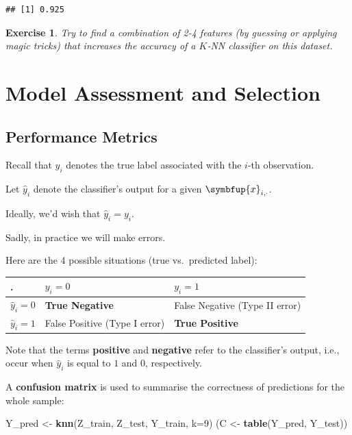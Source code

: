 \documentclass[10pt,b5paper,krantz1]{krantz}
\newenvironment{Shaded}{\begin{snugshade}}{\end{snugshade}}
\newcommand{\DataTypeTok}[1]{\textcolor[rgb]{0.27,0.27,0.27}{#1}}
\newcommand{\DecValTok}[1]{\textcolor[rgb]{0.06,0.06,0.06}{#1}}
\newcommand{\KeywordTok}[1]{\textcolor[rgb]{0.27,0.27,0.27}{\textbf{#1}}}
\newcommand{\NormalTok}[1]{#1}
\newcommand{\StringTok}[1]{\textcolor[rgb]{0.5,0.5,0.5}{#1}}
\newtheorem{exercise}{Exercise}[chapter]
\renewcommand{\mathbf}[1]{\symbfup{#1}}
\begin{document}
\begin{verbatim}
## [1] 0.925
\end{verbatim}

\begin{exercise}

Try to find a combination of 2-4 features (by guessing or applying magic tricks)
that increases the accuracy of a \(K\)-NN classifier on this dataset.

\end{exercise}

\hypertarget{model-assessment-and-selection}{%
\section{Model Assessment and Selection}\label{model-assessment-and-selection}}

\hypertarget{performance-metrics}{%
\subsection{Performance Metrics}\label{performance-metrics}}

Recall that \(y_i\) denotes the true label associated with the \(i\)-th observation.

Let \(\hat{y}_i\) denote the classifier's output for a given \(\mathbf{x}_{i,\cdot}\).

Ideally, we'd wish that \(\hat{y}_i=y_i\).

Sadly, in practice we will make errors.

Here are the 4 possible situations (true vs.~predicted label):

\begin{longtable}[]{@{}lll@{}}
\toprule
. & \(y_i=0\) & \(y_i=1\)\tabularnewline
\midrule
\endhead
\(\hat{y}_i=0\) & \textbf{True Negative} & False Negative (Type II error)\tabularnewline
\(\hat{y}_i=1\) & False Positive (Type I error) & \textbf{True Positive}\tabularnewline
\bottomrule
\end{longtable}

Note that the terms \textbf{positive} and \textbf{negative} refer to
the classifier's output, i.e., occur when \(\hat{y}_i\) is equal to \(1\) and \(0\), respectively.

A \textbf{confusion matrix} is used to summarise
the correctness of predictions for the whole sample:

\begin{Shaded}
\begin{Highlighting}[]
\NormalTok{Y_pred <-}\StringTok{ }\KeywordTok{knn}\NormalTok{(Z_train, Z_test, Y_train, }\DataTypeTok{k=}\DecValTok{9}\NormalTok{)}
\NormalTok{(C <-}\StringTok{ }\KeywordTok{table}\NormalTok{(Y_pred, Y_test))}
\end{Highlighting}
\end{Shaded}
\end{document}
